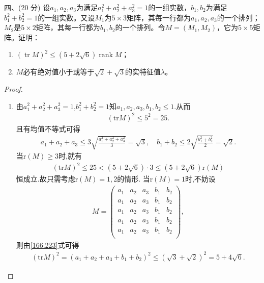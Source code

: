\documentclass[../../main.tex]{subfiles}
\begin{document}
\begin{example}
四、(20 分) 设$a_1,a_2,a_3$为满足$a_1^2 + a_2^2 + a_3^2 = 1$的一组实数，$b_1,b_2$为满足$b_1^2 + b_2^2 = 1$的一组实数。又设$M_1$为$5 \times 3$矩阵，其每一行都为$a_1,a_2,a_3$的一个排列；$M_2$是$5 \times 2$矩阵，其每一行都为$b_1,b_2$的一个排列。令$M = (M_1,M_2)$，它为$5 \times 5$矩阵。证明：
\begin{enumerate}[(1)]
\item $(\operatorname{tr} M)^2 \leq (5 + 2\sqrt{6})\operatorname{rank} M$；

\item $M$必有绝对值小于或等于$\sqrt{2} + \sqrt{3}$的实特征值$\lambda$。
\end{enumerate}
\end{example}
\begin{proof}
\begin{enumerate}[(1)]
\item 由$a_{1}^{2}+a_{2}^{2}+a_{3}^{2}=1$,$b_{1}^{2}+b_{2}^{2}=1$知$a_1,a_2,a_3,b_1,b_2\leqslant 1$.从而
\begin{align*}
\left( \mathrm{tr}M \right) ^2\leqslant 5^2=25.
\end{align*}
且有均值不等式可得
\begin{align}
a_1+a_2+a_3\leqslant 3\sqrt{\frac{a_{1}^{2}+a_{2}^{2}+a_{3}^{2}}{3}}=\sqrt{3},\quad b_1+b_2\leqslant 2\sqrt{\frac{b_{1}^{2}+b_{2}^{2}}{2}}=\sqrt{2}.\label{166.223}
\end{align}
当$\mathrm{r}\left( M \right) \geqslant 3$时,就有
\begin{align*}
\left( \mathrm{tr}M \right) ^2\leqslant 25<\left( 5+2\sqrt{6} \right) \cdot 3\leqslant \left( 5+2\sqrt{6} \right) \mathrm{r}\left( M \right)
\end{align*}
恒成立.故只需考虑$\mathrm{r}\left( M \right) =1,2$的情形.
当$\mathrm{r}\left( M \right) =1$时,不妨设
\begin{align*}
M=\begin{pmatrix}
a_1&	a_2&	a_3&	b_1&	b_2\\
a_1&	a_2&	a_3&	b_1&	b_2\\
a_1&	a_2&	a_3&	b_1&	b_2\\
a_1&	a_2&	a_3&	b_1&	b_2\\
a_1&	a_2&	a_3&	b_1&	b_2\\
\end{pmatrix},
\end{align*}
则由\eqref{166.223}式可得
\begin{align*}
\left( \mathrm{tr}M \right) ^2=\left( a_1+a_2+a_3+b_1+b_2 \right) ^2\leqslant \left( \sqrt{3}+\sqrt{2} \right) ^2=5+4\sqrt{6}.

\end{align*}
\end{enumerate}
\end{proof}
\end{document}

